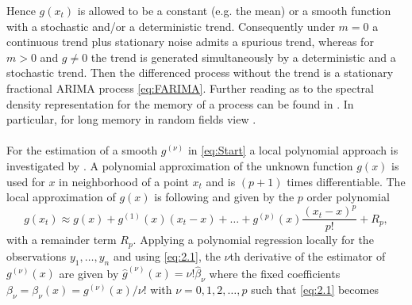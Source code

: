 \documentclass[12pt]{article}
\begin{document}
Hence \(g(x_t)\) is allowed to be a constant (e.g. the mean) or a smooth function with a stochastic and/or a deterministic trend. 
Consequently under \(m = 0\) a  continuous trend plus stationary noise admits a spurious trend, 
whereas for  \(m > 0\) and \(g \neq 0 \) the trend is generated simultaneously by a deterministic and a stochastic trend. 
Then the differenced process without the trend is a stationary fractional ARIMA process \eqref{eq:FARIMA}. 
Further reading as to the spectral density representation for the memory of a process can be found in \textcite{mandelbrot1983fractal,cox1984review,kunsch1987statistical,hampel1987data,beran1995maximum}. In particular, for long memory in random fields view \textcite{angulo2000estimation,anh1999possible}.\\
\\
%
%
For the estimation of a smooth \(g^{(\nu)}\) in \eqref{eq:Start} a local polynomial approach is investigated by \textcite{ruppert1994multivariate,wand1994kernel,fan1995data,beran2002local}.
A polynomial approximation of the unknown function \(g(x)\) is used for \(x\) in neighborhood of a point \(x_{t}\)
and is \((p+1)\) times differentiable. 
The local approximation of \(g(x)\) is following \textcite{beran2016long} and \textcite{beran2002local} given by the \(p\) order polynomial
\begin{equation}
\label{eq:2.1}
g(x_{t}) \approx g(x) + g^{(1)}(x)(x_{t} - x) + \ldots + g^{(p)}(x)\frac{(x_{t} - x)^{p}}{p!} + R_{p},
\end{equation}
with a remainder term \(R_{p}\). 
Applying a polynomial regression locally for the observations \(y_{1},\ldots,y_{n}\) and using \eqref{eq:2.1}, 
the \(\nu\)th derivative of the estimator of \(g^{(\nu)}(x)\) are given by
\(\hat{g}^{(\nu)}(x)= \nu! \hat{\beta}_{\nu}\) 
where the fixed coefficients \(\beta_{\nu} = \beta_{\nu}(x) = g^{(\nu)}(x) / \nu!\) 
with \(\nu = 0,1,2,\ldots,p\) 
such that \eqref{eq:2.1} becomes
\end{document}
